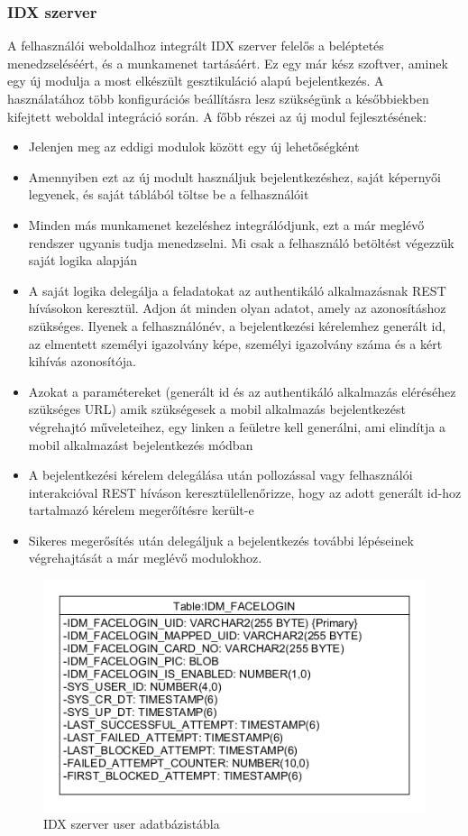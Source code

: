 \subsubsection{IDX szerver}
A felhasználói weboldalhoz integrált IDX szerver felelős a beléptetés menedzseléséért, és a munkamenet tartásáért. Ez egy már kész szoftver, aminek egy új modulja a most elkészült gesztikuláció alapú bejelentkezés. A használatához több konfigurációs beállításra lesz szükségünk a későbbiekben kifejtett weboldal integráció során. A főbb részei az új modul fejlesztésének: 
\begin{itemize}
\item Jelenjen meg az eddigi modulok között egy új lehetőségként
\item Amennyiben ezt az új modult használjuk bejelentkezéshez, saját képernyői legyenek, és saját táblából töltse be a felhasználóit
\item Minden más munkamenet kezeléshez integrálódjunk, ezt a már meglévő rendszer ugyanis tudja menedzselni. Mi csak a felhasználó betöltést végezzük saját logika alapján
\item A saját logika delegálja a feladatokat az authentikáló alkalmazásnak REST hívásokon keresztül. Adjon át minden olyan adatot, amely az azonosításhoz szükséges. Ilyenek a felhasználónév, a bejelentkezési kérelemhez generált id, az elmentett személyi igazolvány képe, személyi igazolvány száma és a kért kihívás azonosítója.
\item Azokat a paramétereket (generált id és az authentikáló alkalmazás eléréséhez szükséges URL) amik szükségesek a mobil alkalmazás bejelentkezést végrehajtó műveleteihez, egy linken a feületre kell generálni, ami elindítja a mobil alkalmazást bejelentkezés módban
\item A bejelentkezési kérelem delegálása után pollozással vagy felhasználói interakcióval REST híváson keresztülellenőrizze, hogy az adott generált id-hoz tartalmazó kérelem megerőítésre került-e
\item Sikeres megerősítés után delegáljuk a bejelentkezés további lépéseinek végrehajtását a már meglévő modulokhoz.
\end{itemize}

\begin{figure}[h]
 \begin{minipage}{1\textwidth} 
\centering
    \includegraphics[scale=0.7]{img/facelogin_idm_db}
    \caption{IDX szerver user adatbázistábla}
 \end{minipage}
\end{figure}

